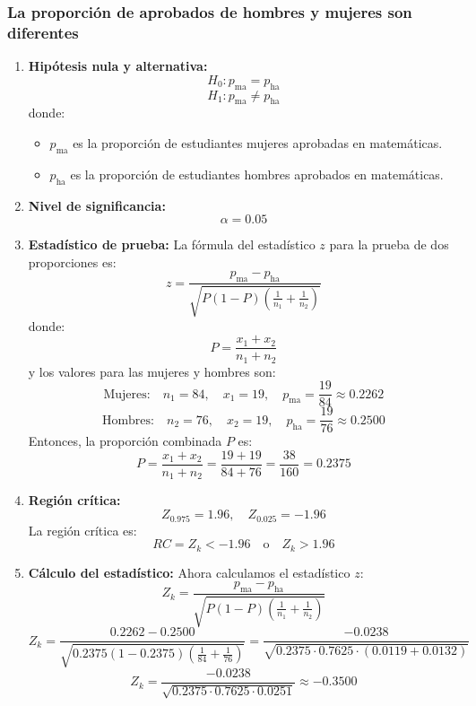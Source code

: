 \documentclass[
]{article}
\begin{document}
\subsubsection*{La proporción de aprobados de hombres y mujeres son
diferentes}\label{la-proporciuxf3n-de-aprobados-de-hombres-y-mujeres-son-diferentes}

\begin{enumerate}
  \item \textbf{Hipótesis nula y alternativa:}
    \[
    H_0: p_{\text{ma}} = p_{\text{ha}}
    \]
    \[
    H_1: p_{\text{ma}} \neq p_{\text{ha}}
    \]
    donde:
    \begin{itemize}
        \item \( p_{\text{ma}} \) es la proporción de estudiantes mujeres aprobadas en matemáticas.
        \item \( p_{\text{ha}} \) es la proporción de estudiantes hombres aprobados en matemáticas.
    \end{itemize}
    
  \item \textbf{Nivel de significancia:}
    \[
    \alpha = 0.05
    \]
    
  \item \textbf{Estadístico de prueba:}
    La fórmula del estadístico \(z\) para la prueba de dos proporciones es:
    \[
    z = \frac{p_{\text{ma}} - p_{\text{ha}}}{\sqrt{P(1 - P) \left( \frac{1}{n_1} + \frac{1}{n_2} \right)}}
    \]
    donde:
    \[
    P = \frac{x_1 + x_2}{n_1 + n_2}
    \]
    y los valores para las mujeres y hombres son:
    \[
    \text{Mujeres:} \quad n_1 = 84, \quad x_1 = 19, \quad p_{\text{ma}} = \frac{19}{84} \approx 0.2262
    \]
    \[
    \text{Hombres:} \quad n_2 = 76, \quad x_2 = 19, \quad p_{\text{ha}} = \frac{19}{76} \approx 0.2500
    \]
    Entonces, la proporción combinada \(P\) es:
    \[
    P = \frac{x_1 + x_2}{n_1 + n_2} = \frac{19 + 19}{84 + 76} = \frac{38}{160} = 0.2375
    \]

  \item \textbf{Región crítica:}
    \[
    Z_{0.975} = 1.96, \quad Z_{0.025} = -1.96
    \]
    La región crítica es:
    \[
    RC = Z_k < -1.96 \quad \text{o} \quad Z_k > 1.96
    \]

  \item \textbf{Cálculo del estadístico:}
    Ahora calculamos el estadístico \(z\):
    \[
    Z_k = \frac{p_{\text{ma}} - p_{\text{ha}}}{\sqrt{P(1 - P) \left( \frac{1}{n_1} + \frac{1}{n_2} \right)}}
    \]
    \[
    Z_k = \frac{0.2262 - 0.2500}{\sqrt{0.2375(1 - 0.2375) \left( \frac{1}{84} + \frac{1}{76} \right)}} = \frac{-0.0238}{\sqrt{0.2375 \cdot 0.7625 \cdot \left( 0.0119 + 0.0132 \right)}}
    \]
    \[
    Z_k = \frac{-0.0238}{\sqrt{0.2375 \cdot 0.7625 \cdot 0.0251}} \approx -0.3500
    \]


\end{enumerate}
\end{document}
